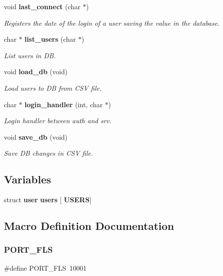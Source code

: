 \begin{DoxyCompactItemize}
void \textbf{ last\+\_\+connect} (char $\ast$)
\begin{DoxyCompactList}\small\item\em Registers the date of the login of a user saving the value in the database. \end{DoxyCompactList}\item 
char $\ast$ \textbf{ list\+\_\+users} (char $\ast$)
\begin{DoxyCompactList}\small\item\em List users in DB. \end{DoxyCompactList}\item 
void \textbf{ load\+\_\+db} (void)
\begin{DoxyCompactList}\small\item\em Load users to DB from C\+SV file. \end{DoxyCompactList}\item 
char $\ast$ \textbf{ login\+\_\+handler} (int, char $\ast$)
\begin{DoxyCompactList}\small\item\em Login handler between auth and srv. \end{DoxyCompactList}\item 
void \textbf{ save\+\_\+db} (void)
\begin{DoxyCompactList}\small\item\em Save DB changes in C\+SV file. \end{DoxyCompactList}\end{DoxyCompactItemize}
\subsection*{Variables}
\begin{DoxyCompactItemize}
\item 
struct \textbf{ user} \textbf{ users} [\textbf{ U\+S\+E\+RS}]
\end{DoxyCompactItemize}


\subsection{Macro Definition Documentation}
\mbox{\label{auth_8h_a618d6577d85428a5a48d41a23c107555}} 
\subsubsection{P\+O\+R\+T\+\_\+\+F\+LS}
{\footnotesize\ttfamily \#define P\+O\+R\+T\+\_\+\+F\+LS~10001}

